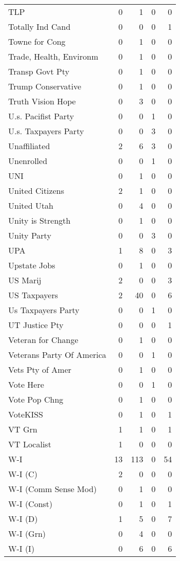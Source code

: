 \begin{supertabular}{lrrrr}
TLP & 0 & 1 & 0 & 0\\
Totally Ind Cand & 0 & 0 & 0 & 1\\
Towne for Cong & 0 & 1 & 0 & 0\\
Trade, Health, Environm & 0 & 1 & 0 & 0\\
Transp Govt Pty & 0 & 1 & 0 & 0\\
Trump Conservative & 0 & 1 & 0 & 0\\
Truth Vision Hope & 0 & 3 & 0 & 0\\
U.s. Pacifist Party & 0 & 0 & 1 & 0\\
U.s. Taxpayers Party & 0 & 0 & 3 & 0\\
Unaffiliated & 2 & 6 & 3 & 0\\
Unenrolled & 0 & 0 & 1 & 0\\
UNI & 0 & 1 & 0 & 0\\
United Citizens & 2 & 1 & 0 & 0\\
United Utah & 0 & 4 & 0 & 0\\
Unity is Strength & 0 & 1 & 0 & 0\\
Unity Party & 0 & 0 & 3 & 0\\
UPA & 1 & 8 & 0 & 3\\
Upstate Jobs & 0 & 1 & 0 & 0\\
US Marij & 2 & 0 & 0 & 3\\
US Taxpayers & 2 & 40 & 0 & 6\\
Us Taxpayers Party & 0 & 0 & 1 & 0\\
UT Justice Pty & 0 & 0 & 0 & 1\\
Veteran for Change & 0 & 1 & 0 & 0\\
Veterans Party Of America & 0 & 0 & 1 & 0\\
Vets Pty of Amer & 0 & 1 & 0 & 0\\
Vote Here & 0 & 0 & 1 & 0\\
Vote Pop Chng & 0 & 1 & 0 & 0\\
VoteKISS & 0 & 1 & 0 & 1\\
VT Grn & 1 & 1 & 0 & 1\\
VT Localist & 1 & 0 & 0 & 0\\
W-I & 13 & 113 & 0 & 54\\
W-I (C) & 2 & 0 & 0 & 0\\
W-I (Comm Sense Mod) & 0 & 1 & 0 & 0\\
W-I (Const) & 0 & 1 & 0 & 1\\
W-I (D) & 1 & 5 & 0 & 7\\
W-I (Grn) & 0 & 4 & 0 & 0\\
W-I (I) & 0 & 6 & 0 & 6\\

\end{supertabular}
